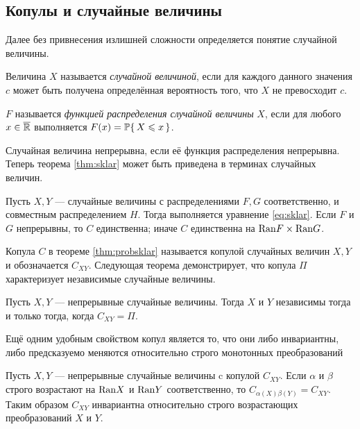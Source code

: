 \subsection*{Копулы и случайные величины}

Далее без привнесения излишней сложности определяется понятие случайной величины.

\begin{define}
	Величина $X$ называется \emph{случайной величиной}, если для каждого данного значения $c$ может быть получена определённая вероятность того, что $X$ не превосходит $c$.
\end{define}

\begin{define}
	$F$ называется \emph{функцией распределения случайной величины} $X$, если для любого $x \in \exR$ выполняется $F(x) = \P\{\, X \leqslant x \,\}$.
\end{define}

Случайная величина непрерывна, если её функция распределения непрерывна. Теперь теорема \ref{thm:sklar} может быть приведена в терминах случайных величин.

\begin{theorem}\label{thm:probsklar}
	Пусть $X, Y$ --- случайные величины с распределениями $F, G$ соответственно, и совместным распределением $H$. Тогда выполняется уравнение \eqref{eq:sklar}.
Если $F$ и $G$ непрерывны, то $C$ единственна; иначе $C$ единственна на $\Ran{F} \times \Ran{G}$.
\end{theorem}

Копула $C$ в теореме \ref{thm:probsklar} называется копулой случайных величин $X, Y$ и обозначается $C_{XY}$. Следующая теорема демонстрирует, что копула $\Pi$ характеризует независимые случайные величины.

\begin{theorem}
	Пусть $X, Y$ --- непрерывные случайные величины. Тогда $X$ и $Y$ независимы тогда и только тогда, когда $C_{XY} = \Pi$.
\end{theorem}

Ещё одним удобным свойством копул является то, что они либо инвариантны, либо предсказуемо меняются относительно строго монотонных преобразований

\begin{theorem}
	Пусть $X, Y$ --- непрерывные случайные величины c копулой $C_{XY}$. Если $\alpha$ и $\beta$ строго возрастают на $\Ran{X}$ и $\Ran{Y}$ соответственно, то $C_{\alpha(X)\beta(Y)} = C_{XY}$. Таким образом $C_{XY}$ инвариантна относительно строго возрастающих преобразований $X$ и $Y$.
\end{theorem}


